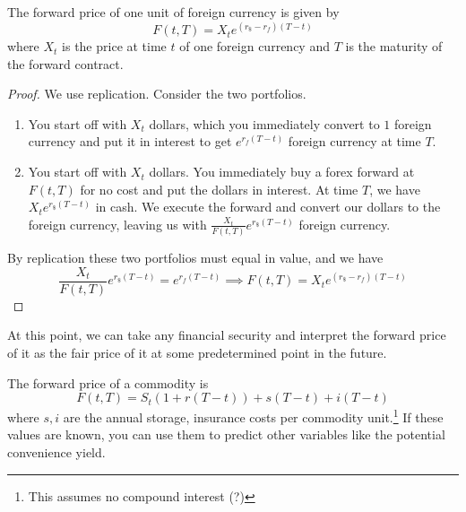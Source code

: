 \documentclass{article}
\begin{document}
    \begin{theorem}
      The forward price of one unit of foreign currency is given by 
      \begin{equation}
        F(t, T) = X_t e^{(r_{\$} - r_f) (T - t)}
      \end{equation}
      where $X_t$ is the price at time $t$ of one foreign currency and $T$ is the maturity of the forward contract. 
    \end{theorem}
    \begin{proof}
      We use replication. Consider the two portfolios. 
      \begin{enumerate}
        \item You start off with $X_t$ dollars, which you immediately convert to $1$ foreign currency and put it in interest to get $e^{r_f (T - t)}$ foreign currency at time $T$. 
        \item You start off with $X_t$ dollars. You immediately buy a forex forward at $F(t, T)$ for no cost and put the dollars in interest. At time $T$, we have $X_t e^{r_{\$} (T - t)}$ in cash. We execute the forward and convert our dollars to the foreign currency, leaving us with $\frac{X_t}{F(t, T)} e^{r_{\$} (T - t)}$ foreign currency. 
      \end{enumerate}
      By replication these two portfolios must equal in value, and we have 
      \begin{equation}
        \frac{X_t}{F(t, T)} e^{r_{\$} (T - t)} = e^{r_f (T - t)} \implies F(t, T) = X_t e^{(r_{\$} - r_f) (T - t)}
      \end{equation}
    \end{proof}

    At this point, we can take any financial security and interpret the forward price of it as the fair price of it at some predetermined point in the future. 

    \begin{example}
      The forward price of a commodity is 
      \begin{equation}
        F(t, T) = S_t (1 + r (T - t)) + s (T - t) + i (T - t)
      \end{equation}
      where $s, i$ are the annual storage, insurance costs per commodity unit.\footnote{This assumes no compound interest (?) } If these values are known, you can use them to predict other variables like the potential convenience yield. 
    \end{example}
\end{document}
